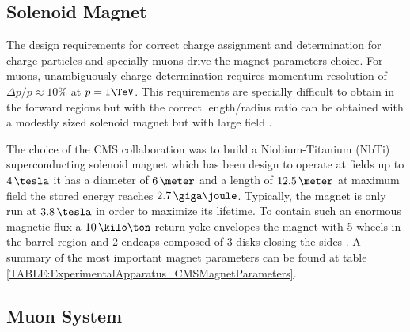 \subsection{Solenoid Magnet}
\label{SUBSECTION:ExperimentalApparatus_CMS_Magnet}


The design requirements for correct charge assignment and \pt determination for charge particles and specially muons drive the magnet parameters choice. For muons, unambiguously charge determination requires momentum resolution of $\Delta p/p \approx 10\%$ at $p = 1 \TeV$. This requirements are specially difficult to obtain in the forward regions but with the correct length/radius ratio can be obtained with a modestly sized solenoid magnet but with large field \cite{CMSTDR:CMSPhysicsVol1,CMSTDR:CMSMagnet}.

The choice of the \gls{CMS} collaboration was to build a Niobium-Titanium (NbTi) superconducting solenoid magnet which has been design to operate at fields up to $4\,\tesla$ it has a diameter of $6\,\meter$ and a length of $12.5\,\meter$ at maximum field the stored energy reaches $2.7\,\giga\joule$. Typically, the magnet is only run at $3.8\,\tesla$ in order to maximize its lifetime. To contain such an enormous magnetic flux a $10\,\kilo\ton$ return yoke envelopes the magnet with 5 wheels in the barrel region and 2 endcaps composed of 3 disks closing the sides \cite{ARTICLE:TheCMSExperiment}. A summary of the most important magnet parameters can be found at table \ref{TABLE:ExperimentalApparatus_CMSMagnetParameters}.



\subsection{Muon System}
\label{SUBSECTION:ExperimentalApparatus_CMS_Moun}


